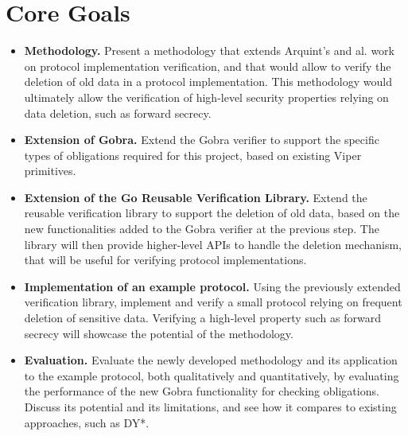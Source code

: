 \documentclass{article}
\begin{document}

\section{Core Goals}

\begin{itemize}
      \item \textbf{Methodology.} Present a methodology that extends Arquint's and al. work on protocol implementation verification, and that would allow to verify the deletion of old data in a protocol implementation. This methodology would ultimately allow the verification of high-level security properties relying on data deletion, such as forward secrecy.
      \item \textbf{Extension of Gobra.}
      Extend the Gobra verifier to support the specific types of obligations required for this project, based on existing Viper primitives.
      \item \textbf{Extension of the Go Reusable Verification Library.} Extend the reusable verification library to support the deletion of old data, based on the new functionalities added to the Gobra verifier at the previous step. The library will then provide higher-level APIs to handle the deletion mechanism, that will be useful for verifying protocol implementations.
      \item \textbf{Implementation of an example protocol.} Using the previously extended verification library, implement and verify a small protocol relying on frequent deletion of sensitive data. Verifying a high-level property such as forward secrecy will showcase the potential of the methodology.
      \item \textbf{Evaluation.} Evaluate the newly developed methodology and its application to the example protocol, both qualitatively and quantitatively, by evaluating the performance of the new Gobra functionality for checking obligations. Discuss its potential and its limitations, and see how it compares to existing approaches, such
      as DY*.

\end{itemize}
\end{document}
